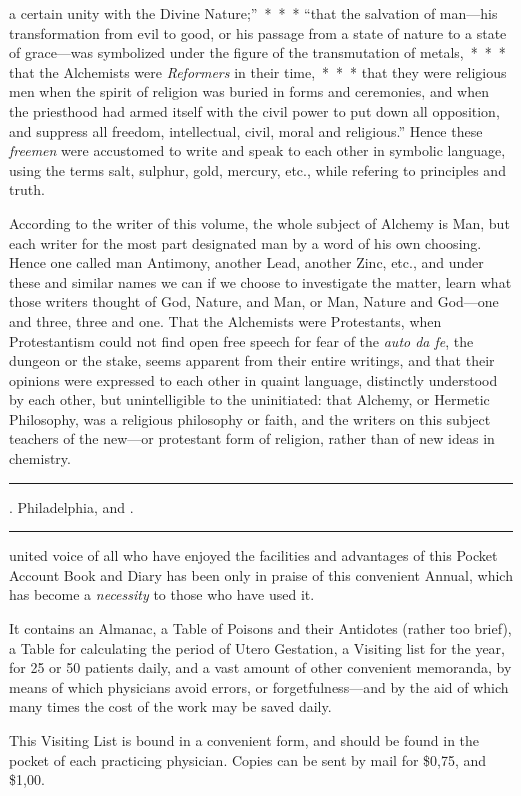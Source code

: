 a certain unity with the Divine Nature;''~*~*~* ``that the salvation
of man---his transformation from evil to good, or his passage from
a state of nature to a state of grace---was symbolized under the figure
of the transmutation of metals,~*~*~* that the Alchemists were
\emph{Reformers} in their time,~*~*~* that they were religious men when
the spirit of religion was buried in forms and ceremonies, and when
the priesthood had armed itself with the civil power to put down all
opposition, and suppress all freedom, intellectual, civil, moral and religious.''
Hence these \emph{freemen} were accustomed to write and speak
to each other in symbolic language, using the terms salt, sulphur, gold,
mercury, etc., while refering to principles and truth.

According to the writer of this volume, the whole subject of Alchemy
is Man, but each writer for the most part designated man by a word of
his own choosing. Hence one called man Antimony, another Lead,
another Zinc, etc., and under these and similar names we can if we
choose to investigate the matter, learn what those writers thought of
God, Nature, and Man, or Man, Nature and God---one and three, three
and one. That the Alchemists were Protestants, when Protestantism
could not find open free speech for fear of the \emph{auto da fe}, the dungeon
or the stake, seems apparent from their entire writings, and that their
opinions were expressed to each other in quaint language, distinctly
understood by each other, but unintelligible to the uninitiated: that
Alchemy, or Hermetic Philosophy, was a religious philosophy or faith,
and the writers on this subject teachers of the new---or protestant form
of religion, rather than of new ideas in chemistry.

\fancybreak{* * *}

\footnotesize
{}. Philadelphia,
 and .
\plainbreak{1}
\normalsize


 united voice of all who have enjoyed the facilities and advantages
of this Pocket Account Book and Diary has been only in praise
of this convenient Annual, which has become a \emph{necessity} to those who
have used it.

It contains an Almanac, a Table of Poisons and their Antidotes
(rather too brief), a Table for calculating the period of Utero Gestation,
a Visiting list for the year, for 25 or 50 patients daily, and a vast
amount of other convenient memoranda, by means of which physicians
avoid errors, or forgetfulness---and by the aid of which many times
the cost of the work may be saved daily.

This Visiting List is bound in a convenient form, and should be found
in the pocket of each practicing physician. Copies can be sent by mail
for \$0,75, and \$1,00.\endinput
